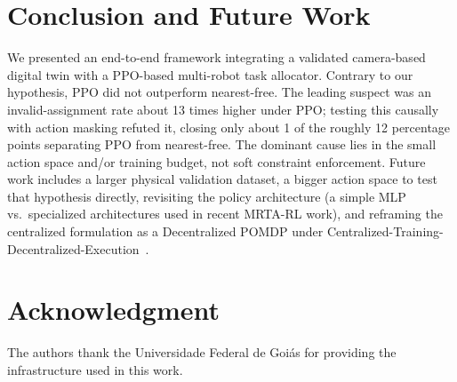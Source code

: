 \documentclass[conference]{IEEEtran}
\begin{document}
\section{Conclusion and Future Work}

We presented an end-to-end framework integrating a validated camera-based digital twin with a PPO-based multi-robot task allocator. Contrary to our hypothesis, PPO did not outperform nearest-free. The leading suspect was an invalid-assignment rate about 13 times higher under PPO; testing this causally with action masking refuted it, closing only about 1 of the roughly 12 percentage points separating PPO from nearest-free. The dominant cause lies in the small action space and/or training budget, not soft constraint enforcement. Future work includes a larger physical validation dataset, a bigger action space to test that hypothesis directly, revisiting the policy architecture (a simple MLP vs.\ specialized architectures used in recent MRTA-RL work), and reframing the centralized formulation as a Decentralized POMDP under Centralized-Training-Decentralized-Execution~\cite{lowe2017multi}.

\balance
\section*{Acknowledgment}
The authors thank the Universidade Federal de Goiás for providing the infrastructure used in this work.
\end{document}
